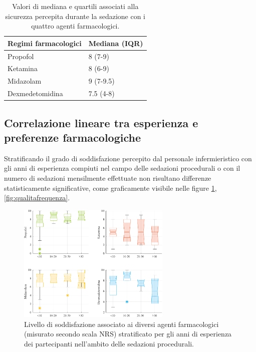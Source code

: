 \bgroup
\def\arraystretch{1.5}
\begin{table}[h]
    \centering
    \begin{tabular}{|l|l|}
         Regimi farmacologici & Mediana (IQR) \\ \hline
       Propofol & 8 (7-9)  \\
       Ketamina & 8 (6-9) \\
       Midazolam & 9 (7-9.5) \\
       Dexmedetomidina & 7.5 (4-8) 
    \end{tabular}
    \caption{Valori di mediana e quartili associati alla sicurezza percepita durante la sedazione con i quattro agenti farmacologici.}
    \label{tab:sicurezzased}
\end{table}
\egroup

\subsection*{Correlazione lineare tra esperienza e preferenze farmacologiche}

Stratificando il grado di soddisfazione percepito dal personale infermieristico con gli anni di esperienza compiuti nel campo delle sedazioni procedurali o con il numero di sedazioni mensilmente effettuate non risultano differenze statisticamente significative, come graficamente visibile nelle figure \ref{fig:qualitaesperienza}, \ref {fig:qualitafrequenza}.

\begin{figure}[h]
    \centering
    \includegraphics[width=0.65\textwidth]{Figure/qualita-strat-esperienza.pdf}
    \caption{Livello di soddisfazione associato ai diversi agenti farmacologici (misurato secondo scala NRS) stratificato per gli anni di esperienza dei partecipanti nell'ambito delle sedazioni procedurali.}
    \label{fig:qualitaesperienza}
\end{figure}

